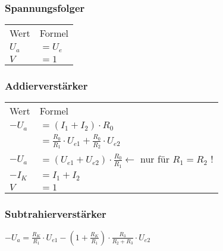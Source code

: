     \subsubsection{Spannungsfolger}
    \begin{minipage}{0.6\columnwidth}
        \begin{table}[H]
            \begin{tabularx}{\columnwidth}{l l}
               Wert & Formel \\
               $U_a$ & $=U_e$ \\
               $V$ & $=1$
            \end{tabularx}
        \end{table}
    \end{minipage}
    \begin{minipage}{0.4\columnwidth}
    \end{minipage}
    \subsubsection{Addierverstärker}
    \begin{minipage}{0.6\columnwidth}
        \renewcommand{\arraystretch}{1.1}
        \begin{table}[H]
            \begin{tabularx}{\columnwidth}{l l}
               Wert & Formel \\
               $-U_a$ & $=(I_1+I_2)\cdot R_0$\\
               & $=\frac{R_0}{R_1}\cdot U_{e1}+\frac{R_0}{R_2}\cdot U_{e2}$ \\
               $-U_a$ & $=(U_{e1}+U_{e2})\cdot\frac{R_0}{R_1}\leftarrow$ nur für $R_1=R_2$ !\\
               $-I_K$ & $=I_1+I_2$\\
               $V$ & $=1$
            \end{tabularx}
        \end{table}
    \end{minipage}
    \begin{minipage}{0.4\columnwidth}
    \end{minipage}
    \subsubsection{Subtrahierverstärker}
    \begin{minipage}{0.6\columnwidth}
        $-U_a=\frac{R_K}{R_1}\cdot U_{e1}-(1+\frac{R_K}{R_1})\cdot \frac{R_3}{R_2+R_3}\cdot U_{e2}$
    \end{minipage}
    \begin{minipage}{0.4\columnwidth}
    \end{minipage}

